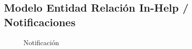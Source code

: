 \subsection{Modelo Entidad Relación In-Help / Notificaciones}
\begin{figure}[htbp!]
	\centering
	\caption{Notificación}
	\label{fig:BD_Notificacion}
\end{figure}